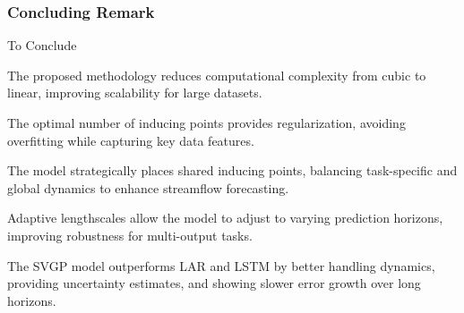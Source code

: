 \subsubsection{Concluding Remark}
\begin{frame}{To Conclude} 
		\begin{block}{}
			\justifying
		The proposed methodology reduces computational complexity from cubic to linear, improving scalability for large datasets. 
		\end{block}
		
		\begin{block}{}
			\justifying
		The optimal number of inducing points provides regularization, avoiding overfitting while capturing key data features. 
		\end{block}
		
		\begin{block}{}
			\justifying
		The model strategically places shared inducing points, balancing task-specific and global dynamics to enhance streamflow forecasting. 
		\end{block}
		
		\begin{block}{}
			\justifying
		Adaptive lengthscales allow the model to adjust to varying prediction horizons, improving robustness for multi-output tasks. 
		\end{block}
		
		\begin{block}{}
			\justifying
		The SVGP model outperforms LAR and LSTM by better handling dynamics, providing uncertainty estimates, and showing slower error growth over long horizons.
		\end{block}
	 \end{frame}



